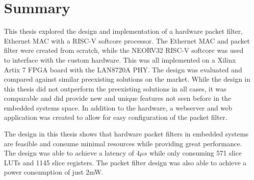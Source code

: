 \section{Summary}

This thesis explored the design and implementation of a hardware packet filter, Ethernet MAC with a RISC-V softcore processor. The Ethernet MAC and packet filter were created from scratch, while the NEORV32 RISC-V softcore was used to interface with the custom hardware. This was all implemented on a Xilinx Artix 7 FPGA board with the LAN8720A PHY. The design was evaluated and compared against similar preexisting solutions on the market. While the design in this thesis did not outperform the preexisting solutions in all cases, it was comparable and did provide new and unique features not seen before in the embedded systems space. In addition to the hardware, a webserver and web application was created to allow for easy configuration of the packet filter. 

The design in this thesis shows that hardware packet filters in embedded systems are feasible and consume minimal resources while providing great performance. The design was able to achieve a latency of $4\mu s$ while only consuming 571 slice LUTs and 1145 slice registers. The packet filter design was also able to achieve a power consumption of just 2mW.